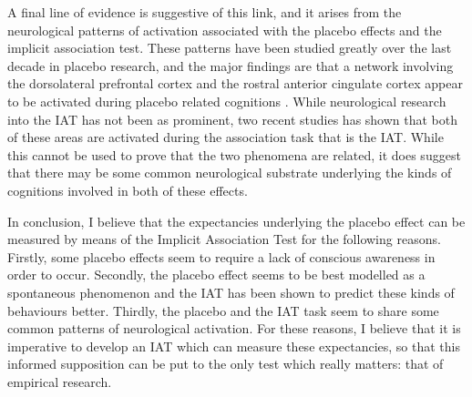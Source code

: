 A final line of evidence is suggestive of this link, and it arises from the neurological patterns of activation associated with the placebo effects and the implicit association test. These patterns have been studied greatly over the last decade in placebo research, and the major findings are that a network involving the dorsolateral prefrontal cortex and the rostral anterior cingulate cortex appear to be activated during placebo related cognitions \cite{Mayberg2002,Zubieta2006}. While neurological research into the IAT has not been as prominent, two recent studies  \cite{Knutson2007,Knutson2006} has shown that both of these areas are activated during the association task that is the IAT. While this cannot be used to prove that the two phenomena are related, it does suggest that there may be some common neurological substrate underlying the kinds of cognitions involved in both of these effects. 

In conclusion, I believe that the expectancies underlying the placebo effect can be measured by means of the Implicit Association Test for the following reasons. Firstly, some placebo effects seem to require a lack of conscious awareness in order to occur. Secondly, the placebo effect seems to be best modelled as a spontaneous phenomenon and the IAT has been shown to predict these kinds of behaviours better. Thirdly, the placebo and the IAT task seem to share some common patterns of neurological activation. For these reasons, I believe that it is imperative to develop an IAT which can measure these expectancies, so that this informed supposition can be put to the only test which really matters: that of empirical research.  

